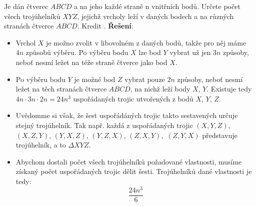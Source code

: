 \begin{mdframed}[style=mdexam]
  \begin{example}\label{mai:exam095}
    Je dán čtverec \(ABCD\) a na jeho každé straně n vnitřních bodů. Určete počet všech trojúhelníků
    \(XYZ\), jejichž vrcholy leží v daných bodech a na různých stranách čtverce \(ABCD\). Kredit
    \cite[s.~9]{calda2008matematika}.\newline
    \textbf{Řešení}:
    \begin{itemize}[noitemsep]
      \item Vrchol \(X\) je možno zvolit v libovolném z daných bodů, takže pro něj máme \(4n\)
            způsobů výběru. Po výběru bodu \(X\) lze bod \(Y\) vybrat už jen \(3n\) způsoby, neboť
            nesmí ležet na téže straně čtverce jako bod \(X\).
      \item Po výběru bodu \(Y\) je možné bod \(Z\) vybrat pouze \(2n\) způsoby, neboť nesmí ležet
            na těch stranách čtverce \(ABCD\), na nichž leží body \(X\), \(Y\). Existuje tedy
            \(4n\cdot3n \cdot2n = 24n^3\) uspořádaných trojic utvořených z bodů \(X\), \(Y\), \(Z\).
      \item Uvědomme si však, že šest uspořádáných trojic takto sestavených určuje stejný
            trojúhelník. Tak např. každá z uspořádaných trojic \((X, Y, Z)\), \((X, Z, Y)\), \((Y,
            X, Z)\), \((Y, Z, X)\), \((Z, X, Y),\) \((Z, Y, X)\) představuje trojúhelník, a to
            \(\Delta XYZ\). 
      \item Abychom dostali počet všech trojúhelníků požadované vlastnosti, musíme získaný počet
            uspořádaných trojic dělit šesti. Trojúhelníků dané vlastnosti je tedy:
            \begin{equation*} 
              \dfrac{24n^3}{6}
            \end{equation*}
    \end{itemize}

    {\centering
    \captionsetup{type=figure} 
    \label{mai:fig069}
    \par}

  \end{example}
\end{mdframed}